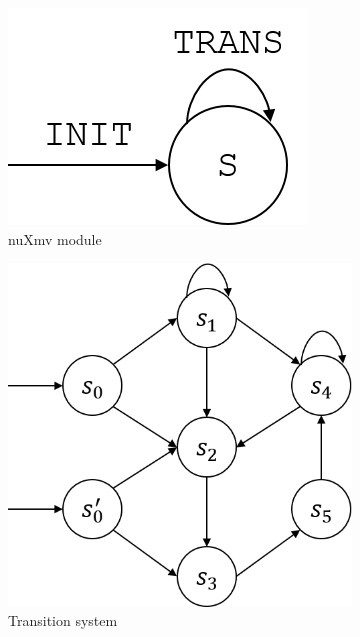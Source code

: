 \begin{figure}
    \def\subfigw{0.5\textwidth}
    \def\figscale{0.4}
    \begin{subfigure}[b]{\subfigw}
        \centering
        \includegraphics[scale=\figscale]{figures/module.png}
        \caption{nuXmv module}
    \end{subfigure}
    \begin{subfigure}[b]{\subfigw}
        \centering
        \includegraphics[scale=\figscale]{figures/transition-system.png}
        \caption{Transition system}
    \end{subfigure}
    \begin{subfigure}[b]{\subfigw}
        \centering

\end{subfigure}
\end{figure}
